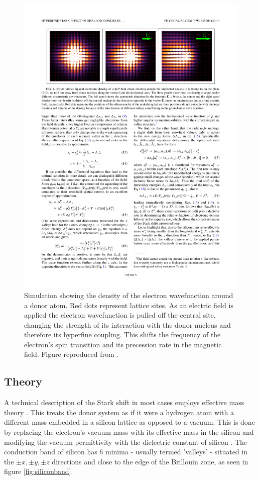 \begin{figure}
\centering
\includegraphics[width=\textwidth]{Figures/starkShift.pdf}
\caption[Electron wavefunction Stark shift]{Simulation showing the density of the electron wavefunction around a donor atom. Red dots represent lattice sites. As an electric field is applied the electron wavefunction is pulled off the central site, changing the strength of its interaction with the donor nucleus and therefore its hyperfine coupling. This shifts the frequency of the electron's spin transition and its precession rate in the magnetic field. Figure reproduced from \cite{Pica2014}.}
\label{fig:starkShift}
\end{figure}

\subsection{Theory}

A technical description of the Stark shift in most cases employs effective mass theory \cite{Pica2014}.
This treats the donor system as if it were a hydrogen atom with a different mass embedded in a silicon lattice as opposed to a vacuum.
This is done by replacing the electron's vacuum mass with its effective mass in the silicon and modifying the vacuum permittivity with the dielectric constant of silicon \cite{Wolfowicz2015a}.
The conduction band of silicon has 6 minima - usually termed 'valleys' - situated in the $\pm x, \pm y, \pm z$ directions and close to the edge of the Brillouin zone, as seen in figure \ref{fig:siliconband}. 

